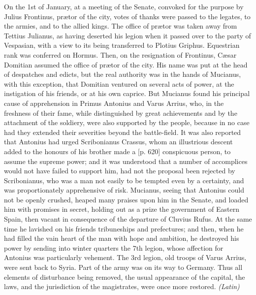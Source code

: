 On the 1st of January, at a meeting of the Senate, convoked for the purpose by Julius Frontinus, prætor of the city, votes of thanks were passed to the legates, to the armies, and to the allied kings. The office of prætor was taken away from Tettius Julianus, as having deserted his legion when it passed over to the party of Vespasian, with a view to its being transferred to Plotius Griphus. Equestrian rank was conferred on Hormus. Then, on the resignation of Frontinus, Cæsar Domitian assumed the office of prætor of the city. His name was put at the head of despatches and edicts, but the real authority was in the hands of Mucianus, with this exception, that Domitian ventured on several acts of power, at the instigation of his friends, or at his own caprice. But Mucianus found his principal cause of apprehension in Primus Antonius and Varus Arrius, who, in the freshness of their fame, while distinguished by great achievements and by the attachment of the soldiery, were also supported by the people, because in no case had they extended their severities beyond the battle-field. It was also reported that Antonius had urged Scribonianus Crassus, whom an illustrious descent added to the honours of his brother made a [p. 620] conspicuous person, to assume the supreme power; and it was understood that a number of accomplices would not have failed to support him, had not the proposal been rejected by Scribonianus, who was a man not easily to be tempted even by a certainty, and was proportionately apprehensive of risk. Mucianus, seeing that Antonius could not be openly crushed, heaped many praises upon him in the Senate, and loaded him with promises in secret, holding out as a prize the government of Eastern Spain, then vacant in consequence of the departure of Cluvius Rufus. At the same time he lavished on his friends tribuneships and prefectures; and then, when he had filled the vain heart of the man with hope and ambition, he destroyed his power by sending into winter quarters the 7th legion, whose affection for Antonius was particularly vehement. The 3rd legion, old troops of Varus Arrius, were sent back to Syria. Part of the army was on its way to Germany. Thus all elements of disturbance being removed, the usual appearance of the capital, the laws, and the jurisdiction of the magistrates, were once more restored. \emph{(Latin)}


